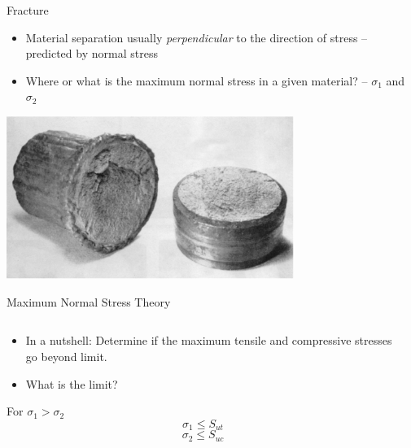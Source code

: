 \documentclass[10pt, svgnames]{beamer}
\begin{document}
\begin{frame}[label={sec:orgd48366b}]{Fracture}
\begin{itemize}
\item Material separation usually \emph{perpendicular} to the direction of stress -- predicted by normal stress
\item Where or what is the maximum normal stress in a given material? -- \(\sigma_1\) and \(\sigma_2\)
\end{itemize}

\begin{center}
\includegraphics[width=0.7\textwidth]{pictures/brittle-failure.pdf}
\end{center}
\end{frame}

\begin{frame}[label={sec:org341dfa1}]{Maximum Normal Stress Theory}
\begin{columns}
\begin{column}{0.4\columnwidth}
\begin{itemize}
\item In a nutshell: Determine if the maximum tensile and compressive stresses go beyond limit.
\item What is the limit?
\end{itemize}

For \(\sigma_1 > \sigma_2\)
$$\sigma_1 \leqslant S_{ut} $$
$$\sigma_2 \leqslant S_{uc} $$
\end{column}

\begin{column}{0.6\columnwidth}
\end{column}
\end{columns}
\end{frame}
\end{document}
